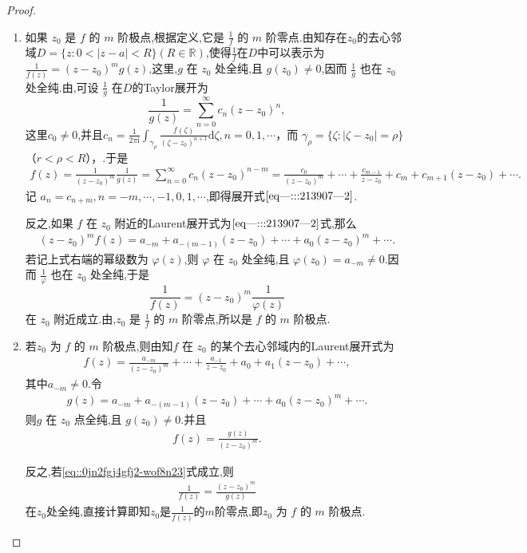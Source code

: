 \documentclass[../../main.tex]{subfiles}%
\begin{document}
\begin{proof}
\begin{enumerate}[(1)]
\item 如果 \( z_0 \) 是 \( f \) 的 \( m \) 阶极点,根据定义,它是 \( \frac{1}{f} \) 的 \( m \) 阶零点.由知存在$z_0$的去心邻域$D=\{z:0<|z-a|<R\}(R\in\mathbb{R})$,使得$\frac{1}{f}$在$D$中可以表示为 \( \frac{1}{f(z)} = (z - z_0)^m g(z) \),这里,\( g \) 在 \( z_0 \) 处全纯,且 \( g(z_0) \neq 0 \),因而 \( \frac{1}{g} \) 也在 \( z_0 \) 处全纯.由,可设 \( \frac{1}{g} \) 在$D$的Taylor展开为
\[
\frac{1}{g(z)} = \sum_{n=0}^{\infty} c_n (z - z_0)^n,
\]
这里\( c_0 \neq 0 \),并且\( c_n = \frac{1}{2\pi \mathrm{i}} \int_{\gamma_{\rho}} \frac{f(\zeta)}{(\zeta - z_0)^{n + 1}} \mathrm{d}\zeta,n=0,1,\cdots \)，而 \( \gamma_{\rho} = \{ \zeta: |\zeta - z_0| = \rho \} \)（\( r < \rho < R \)），.于是
\begin{align*}
f(z) = \frac{1}{(z - z_0)^m} \frac{1}{g(z)} = \sum_{n=0}^{\infty} c_n (z - z_0)^{n - m} = \frac{c_0}{(z - z_0)^m} + \cdots + \frac{c_{m - 1}}{z - z_0} + c_m + c_{m + 1}(z - z_0) + \cdots.
\end{align*}
记 \( a_n = c_{n + m}, n = -m, \cdots, -1, 0, 1, \cdots \),即得展开式\(\eqref{eq---:::213907---2}\).

反之,如果 \( f \) 在 \( z_0 \) 附近的Laurent展开式为\(\eqref{eq---:::213907---2}\)式,那么
\begin{align*}
(z - z_0)^m f(z) = a_{-m} + a_{-(m - 1)}(z - z_0) + \cdots + a_0(z - z_0)^m + \cdots.
\end{align*}
若记上式右端的幂级数为 \( \varphi(z) \),则 \( \varphi \) 在 \( z_0 \) 处全纯,且 \( \varphi(z_0) = a_{-m} \neq 0 \).因而 \( \frac{1}{\varphi} \) 也在 \( z_0 \) 处全纯,于是
\[
\frac{1}{f(z)} = (z - z_0)^m \frac{1}{\varphi(z)}
\]
在 \( z_0 \) 附近成立.由,\( z_0 \) 是 \( \frac{1}{f} \) 的 \( m \) 阶零点,所以是 \( f \) 的 \( m \) 阶极点.

\item 若\( z_0 \) 为 \( f \) 的 \( m \) 阶极点,则由知\( f \) 在 \( z_0 \) 的某个去心邻域内的Laurent展开式为
\begin{align*}
f(z) = \frac{a_{-m}}{(z - z_0)^m} + \cdots + \frac{a_{-1}}{z - z_0} + a_0 + a_1(z - z_0) + \cdots,
\end{align*}
其中\( a_{-m} \neq 0 \).令
\begin{align*}
g(z) = a_{-m} + a_{-(m - 1)}(z - z_0) + \cdots + a_0(z - z_0)^m + \cdots.
\end{align*}
则\( g \) 在 \( z_0 \) 点全纯,且 \( g(z_0) \neq 0 \).并且
\begin{align*}
f(z) = \frac{g(z)}{(z-z_0)^m}.
\end{align*}

反之,若\eqref{eq::0jn2fgj4gfj2-wof8n23}式成立,则
\begin{align*}
\frac{1}{f(z)}=\frac{(z-z_0)^m}{g(z)}
\end{align*}
在$z_0$处全纯,直接计算即知$z_0$是$\frac{1}{f(z)}$的$m$阶零点,即\( z_0 \) 为 \( f \) 的 \( m \) 阶极点.
\end{enumerate}
\end{proof}
\end{document}
